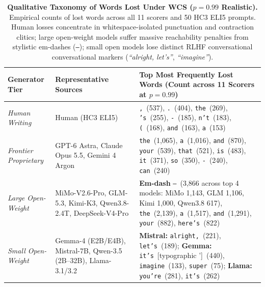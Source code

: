 \documentclass[11pt,a4paper,twocolumn]{article}
\begin{document}
\begin{table}[t]
\centering
\small
\setlength{\tabcolsep}{4pt}
\begin{tabular}{lp{4.2cm}p{8.8cm}}
\toprule
\textbf{Generator Tier} & \textbf{Representative Sources} & \textbf{Top Most Frequently Lost Words (Count across 11 Scorers at $p=0.99$)} \\
\midrule
\textit{Human Writing} & Human (HC3 ELI5) & \texttt{,}\ (537), \texttt{.}\ (404), \texttt{the}\ (269), \texttt{'s}\ (255), \texttt{-}\ (185), \texttt{n't}\ (183), \texttt{(}\ (168), \texttt{and}\ (163), \texttt{a}\ (153) \\
\midrule
\textit{Frontier Proprietary} & GPT-6 Astra, Claude Opus 5.5, Gemini 4 Argon & \texttt{the}\ (1,065), \texttt{a}\ (1,016), \texttt{and}\ (870), \texttt{your}\ (539), \texttt{that}\ (521), \texttt{is}\ (483), \texttt{it}\ (371), \texttt{so}\ (350), \texttt{-}\ (240), \texttt{can}\ (240) \\
\midrule
\textit{Large Open-Weight} & MiMo-V2.6-Pro, GLM-5.3, Kimi-K3, Qwen3.8-2.4T, DeepSeek-V4-Pro & \textbf{Em-dash} \texttt{—}\ (3,866 across top 4 models: MiMo 1,143, GLM 1,106, Kimi 1,000, Qwen3.8 617), \texttt{the}\ (2,139), \texttt{a}\ (1,517), \texttt{and}\ (1,291), \texttt{your}\ (882), \texttt{here's}\ (822) \\
\midrule
\textit{Small Open-Weight} & Gemma-4 (E2B/E4B), Mistral-7B, Qwen-3.5 (2B--32B), Llama-3.1/3.2 & \textbf{Mistral:} \texttt{alright,}\ (221), \texttt{let's}\ (189); \textbf{Gemma:} \texttt{it's}\ [typographic ’]\ (440), \texttt{imagine}\ (133), \texttt{super}\ (75); \textbf{Llama:} \texttt{you're}\ (281), \texttt{it's}\ (262) \\
\bottomrule
\end{tabular}
\caption{\textbf{Qualitative Taxonomy of Words Lost Under WCS ($p=0.99$ Realistic).} Empirical counts of lost words across all 11 scorers and 50 HC3 ELI5 prompts. Human losses concentrate in whitespace-isolated punctuation and contraction clitics; large open-weight models suffer massive reachability penalties from stylistic em-dashes (\texttt{—}); small open models lose distinct RLHF conversational conversational markers (\emph{``alright, let's''}, \emph{``imagine''}).}
\label{tab:lost_words}
\end{table}
\end{document}
